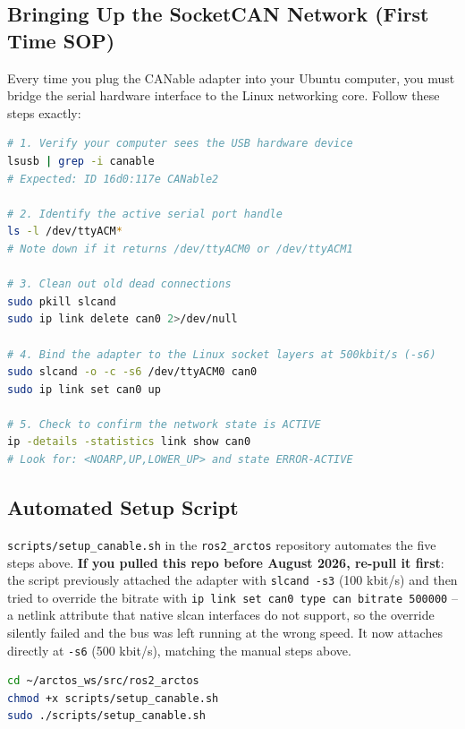 \documentclass[11pt,letterpaper]{article}
\begin{document}
\subsection{Bringing Up the SocketCAN Network (First Time SOP)}
\label{sec:can-bringup}
Every time you plug the CANable adapter into your Ubuntu computer, you must bridge the serial hardware interface to the Linux networking core. Follow these steps exactly:

\begin{lstlisting}[language=bash, caption=Linux Terminal CAN Interface Setup]
# 1. Verify your computer sees the USB hardware device
lsusb | grep -i canable
# Expected: ID 16d0:117e CANable2

# 2. Identify the active serial port handle
ls -l /dev/ttyACM*
# Note down if it returns /dev/ttyACM0 or /dev/ttyACM1

# 3. Clean out old dead connections
sudo pkill slcand
sudo ip link delete can0 2>/dev/null

# 4. Bind the adapter to the Linux socket layers at 500kbit/s (-s6)
sudo slcand -o -c -s6 /dev/ttyACM0 can0
sudo ip link set can0 up

# 5. Check to confirm the network state is ACTIVE
ip -details -statistics link show can0
# Look for: <NOARP,UP,LOWER_UP> and state ERROR-ACTIVE
\end{lstlisting}

\subsection{Automated Setup Script}
\texttt{scripts/setup\_canable.sh} in the \texttt{ros2\_arctos} repository automates the five steps above. \textbf{If you pulled this repo before August 2026, re-pull it first}: the script previously attached the adapter with \texttt{slcand -s3} (100 kbit/s) and then tried to override the bitrate with \texttt{ip link set can0 type can bitrate 500000} -- a netlink attribute that native slcan interfaces do not support, so the override silently failed and the bus was left running at the wrong speed. It now attaches directly at \texttt{-s6} (500 kbit/s), matching the manual steps above.

\begin{lstlisting}[language=bash, caption=Running the Automated Setup Script]
cd ~/arctos_ws/src/ros2_arctos
chmod +x scripts/setup_canable.sh
sudo ./scripts/setup_canable.sh
\end{lstlisting}
\end{document}
